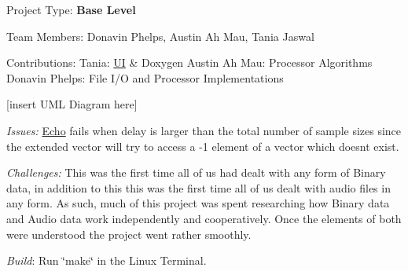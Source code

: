 Project Type\+: {\bfseries{Base Level}}

Team Members\+: Donavin Phelps, Austin Ah Mau, Tania Jaswal

Contributions\+: Tania\+: \mbox{\hyperlink{classUI}{UI}} \& Doxygen Austin Ah Mau\+: Processor Algorithms Donavin Phelps\+: File I/O and Processor Implementations

\mbox{[}insert U\+ML Diagram here\mbox{]}

{\itshape Issues\+:} \mbox{\hyperlink{classEcho}{Echo}} fails when delay is larger than the total number of sample sizes since the extended vector will try to access a -\/1 element of a vector which doesn\textquotesingle{}t exist.

{\itshape Challenges\+:} This was the first time all of us had dealt with any form of Binary data, in addition to this this was the first time all of us dealt with audio files in any form. As such, much of this project was spent researching how Binary data and Audio data work independently and cooperatively. Once the elements of both were understood the project went rather smoothly.

{\itshape Build}\+: Run \char`\"{}make\char`\"{} in the Linux Terminal. 